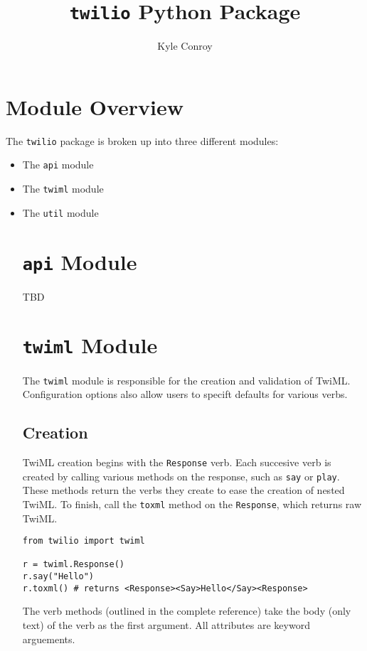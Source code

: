 \documentclass{article}
\title{\texttt{twilio} Python Package}
\author{ Kyle Conroy }
\begin{document}
\maketitle

\section{Module Overview}

The \texttt{twilio} package is broken up into three different modules:
\begin{itemize}
\item The \texttt{api} module
\item The \texttt{twiml} module
\item The \texttt{util} module

\section{\texttt{api} Module}

TBD

\section{\texttt{twiml} Module}

The \texttt{twiml} module is responsible for the creation and validation of TwiML. Configuration options also allow users to specift defaults for various verbs.

\subsection{Creation}

TwiML creation begins with the \texttt{Response} verb. Each succesive verb is created by calling various methods on the response, such as \texttt{say} or \texttt{play}. These methods return the verbs they create to ease the creation of nested TwiML. To finish, call the \texttt{toxml} method on the \texttt{Response}, which returns raw TwiML.

\begin{verbatim}
from twilio import twiml

r = twiml.Response()
r.say("Hello")
r.toxml() # returns <Response><Say>Hello</Say><Response>
\end{verbatim}

The verb methods (outlined in the complete reference) take the body (only text) of the verb as the first argument. All attributes are keyword arguements.


\end{itemize}
\end{document}
